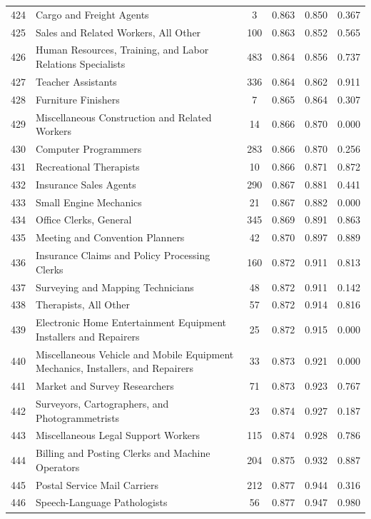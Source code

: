 {\begin{longtable}{llcccc}
 424 & Cargo and Freight Agents & 3 & 0.863 & 0.850 & 0.367 \\
 425 & Sales and Related Workers, All Other & 100 & 0.863 & 0.852 & 0.565 \\
 426 & Human Resources, Training, and Labor Relations Specialists & 483 & 0.864 & 0.856 & 0.737 \\
 427 & Teacher Assistants & 336 & 0.864 & 0.862 & 0.911 \\
 428 & Furniture Finishers & 7 & 0.865 & 0.864 & 0.307 \\
 429 & Miscellaneous Construction and Related Workers & 14 & 0.866 & 0.870 & 0.000 \\
 430 & Computer Programmers & 283 & 0.866 & 0.870 & 0.256 \\
 431 & Recreational Therapists & 10 & 0.866 & 0.871 & 0.872 \\
 432 & Insurance Sales Agents & 290 & 0.867 & 0.881 & 0.441 \\
 433 & Small Engine Mechanics & 21 & 0.867 & 0.882 & 0.000 \\
 434 & Office Clerks, General & 345 & 0.869 & 0.891 & 0.863 \\
 435 & Meeting and Convention Planners & 42 & 0.870 & 0.897 & 0.889 \\
 436 & Insurance Claims and Policy Processing Clerks & 160 & 0.872 & 0.911 & 0.813 \\
 437 & Surveying and Mapping Technicians & 48 & 0.872 & 0.911 & 0.142 \\
 438 & Therapists, All Other & 57 & 0.872 & 0.914 & 0.816 \\
 439 & Electronic Home Entertainment Equipment Installers and Repairers & 25 & 0.872 & 0.915 & 0.000 \\
 440 & Miscellaneous Vehicle and Mobile Equipment Mechanics, Installers, and Repairers & 33 & 0.873 & 0.921 & 0.000 \\
 441 & Market and Survey Researchers & 71 & 0.873 & 0.923 & 0.767 \\
 442 & Surveyors, Cartographers, and Photogrammetrists & 23 & 0.874 & 0.927 & 0.187 \\
 443 & Miscellaneous Legal Support Workers & 115 & 0.874 & 0.928 & 0.786 \\
 444 & Billing and Posting Clerks and Machine Operators & 204 & 0.875 & 0.932 & 0.887 \\
 445 & Postal Service Mail Carriers & 212 & 0.877 & 0.944 & 0.316 \\
 446 & Speech-Language Pathologists & 56 & 0.877 & 0.947 & 0.980 \\

\end{longtable}}
